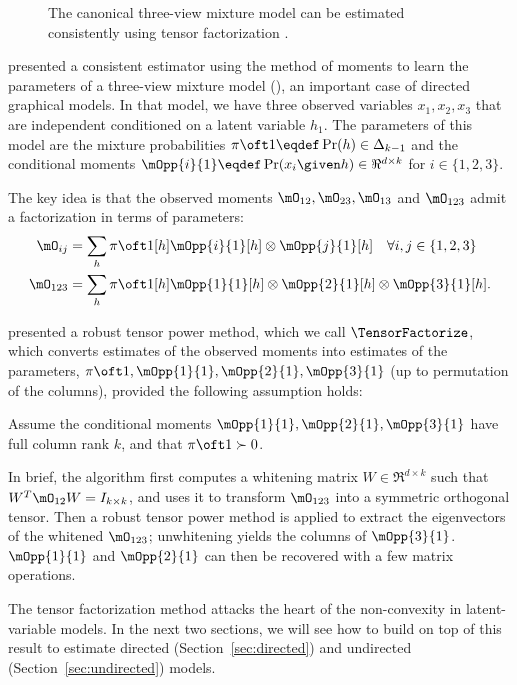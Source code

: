 \begin{figure}[t]
  \label{fig:three-view}
  \centering
  
  \caption{The canonical three-view mixture model can be estimated consistently using tensor factorization \citet{anandkumar13tensor}.}
\end{figure}

\citet{anandkumar12moments} presented a consistent estimator
  using the method of moments to learn the parameters of a three-view
  mixture model (), an important case of directed
  graphical models. %
In that model, we have three observed variables $x_1, x_2, x_3$
  that are independent conditioned on a latent variable $h_1$.  
The parameters of this model are the mixture probabilities $\pi\oft 1 \eqdef
  \Pr(h) \in \Delta_{k-1}$ and the conditional moments $\mOpp{i}{1} \eqdef
  \Pr(x_i \given h) \in \Re^{d \times k}$ for $i \in \{1,2,3\}$.

  The key idea is that the observed moments $\mO_{12}, \mO_{23}, \mO_{13}$ and
  $\mO_{123}$ admit a factorization in terms of parameters:
\begin{align*}
  \mO_{ij} &= \sum_h {\pi \oft 1}[h] {\mOpp{i}{1}}[h] \otimes {\mOpp{j}{1}}[h] \quad \forall i,j \in \{1,2,3\} \\
  \mO_{123} &= \sum_h {\pi \oft 1}[h] {\mOpp{1}{1}}[h] \otimes {\mOpp{2}{1}}[h] \otimes  {\mOpp{3}{1}}[h].
\end{align*}

\citet{anandkumar13tensor} presented a robust tensor power method, which
  we call $\TensorFactorize$, which converts estimates of the observed moments 
  into estimates of the parameters, $\pi\oft 1, \mOpp{1}{1},
  \mOpp{2}{1},\mOpp{3}{1}$ (up to permutation of the columns), provided
  the following assumption holds:

\begin{assumption}
\label{asm:full-rank}
Assume the conditional moments $\mOpp{1}{1}, \mOpp{2}{1}, \mOpp{3}{1}$ have full column rank
  $k$, and that $\pi\oft 1 \succ 0$.
\end{assumption}

In brief, the algorithm first computes a whitening matrix $W \in
  \Re^{d \times k}$ such that $W^T \mO_{12} W = I_{k \times k}$,
  and uses it to transform $\mO_{123}$ into a symmetric orthogonal tensor.  
Then a robust tensor power method is applied to extract the eigenvectors
of the whitened $\mO_{123}$; unwhitening yields the columns of $\mOpp{3}{1}$.
  $\mOpp{1}{1}$ and $\mOpp{2}{1}$ can then be recovered with a few matrix operations.

The tensor factorization method attacks the heart of the non-convexity
  in latent-variable models.  In the next two sections,
  we will see how to build on top of this result to estimate directed (Section~\ref{sec:directed})
  and undirected (Section~\ref{sec:undirected}) models.
